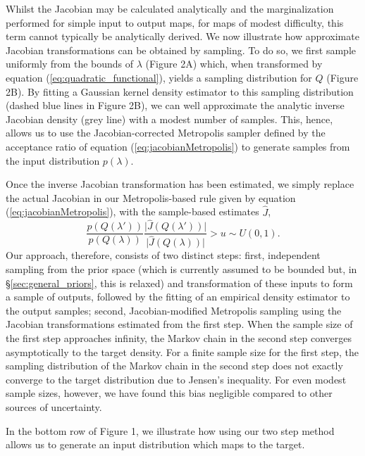 \documentclass[10pt,letterpaper]{article}
\begin{document}
Whilst the Jacobian may be calculated analytically and the marginalization performed for simple input to output maps, for maps of modest difficulty, this term cannot typically be analytically derived. We now illustrate how approximate Jacobian transformations can be obtained by sampling. To do so, we first sample uniformly from the bounds of $\lambda$ (Figure 2A) which, when transformed by equation (\ref{eq:quadratic_functional}), yields a sampling distribution for $Q$ (Figure 2B). By fitting a Gaussian kernel density estimator to this sampling distribution (dashed blue lines in Figure 2B), we can well approximate the analytic inverse Jacobian density (grey line) with a modest number of samples. This, hence, allows us to use the Jacobian-corrected Metropolis sampler defined by the acceptance ratio of equation (\ref{eq:jacobianMetropolis}) to generate samples from the input distribution $p(\lambda)$.

Once the inverse Jacobian transformation has been estimated, we simply replace the actual Jacobian in our Metropolis-based rule given by equation (\ref{eq:jacobianMetropolis}), with the sample-based estimates $\hat{J}$,
%
\begin{equation}\label{eq:jacobianMetropolisBySampling}
\frac{p(Q(\lambda'))}{p(Q(\lambda))}\frac{\vert \hat{J}(Q(\lambda')) \vert}{\vert \hat{J}(Q(\lambda)) \vert}>u\sim U(0,1).
\end{equation}
%
Our approach, therefore, consists of two distinct steps: first, independent sampling from the prior space (which is currently assumed to be bounded but, in \S \ref{sec:general_priors}, this is relaxed) and transformation of these inputs to form a sample of outputs, followed by the fitting of an empirical density estimator to the output samples; second, Jacobian-modified Metropolis sampling using the Jacobian transformations estimated from the first step. When the sample size of the first step approaches infinity, the Markov chain in the second step converges asymptotically to the target density. For a finite sample size for the first step, the sampling distribution of the Markov chain in the second step does not exactly converge to the target distribution due to Jensen's inequality. For even modest sample sizes, however, we have found this bias negligible compared to other sources of uncertainty.

In the bottom row of Figure 1, we illustrate how using our two step method allows us to generate an input distribution which maps to the target.
\end{document}
